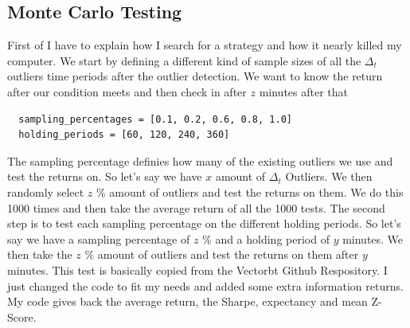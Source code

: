 \documentclass[12pt]{article}
\begin{document}
\subsection*{Monte Carlo Testing}

First of I have to explain how I search for a strategy and how it nearly killed my computer. 
We start by defining a different kind of sample sizes of all the $\Delta_t$ outliers time periods after the outlier detection. 
We want to know the return after our condition meets and then check in after $z$ minutes after that
\begin{verbatim}
  sampling_percentages = [0.1, 0.2, 0.6, 0.8, 1.0]
  holding_periods = [60, 120, 240, 360]  
\end{verbatim}

The sampling percentage definies how many of the existing outliers we use and test the returns on. So let's say we have $x$ amount of $\Delta_t$ Outliers. We then randomly select $z$ \% amount of outliers and test the returns on them. We do this 1000 times and then take the average return of all the 1000 tests.
The second step is to test each sampling percentage on the different holding periods. So let's say we have a sampling percentage of $z$ \% and a holding period of $y$ minutes. We then take the $z$ \% amount of outliers and test the returns on them after $y$ minutes. This test is basically copied from the Vectorbt Github Respository. I just changed the code to fit my needs and added some extra information returns. My code gives back the average return, the Sharpe, expectancy and mean Z-Score.
\end{document}
